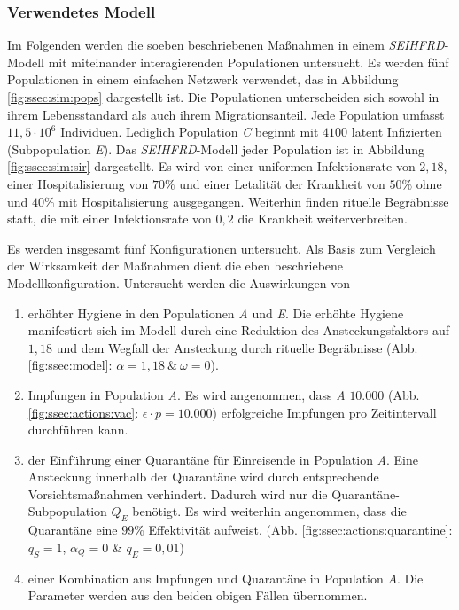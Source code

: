 \subsubsection{Verwendetes Modell}\steffen
Im Folgenden werden die soeben beschriebenen Maßnahmen in einem \emph{SEIHFRD}-Modell mit miteinander interagierenden Populationen untersucht. Es werden fünf Populationen in einem einfachen Netzwerk verwendet, das in Abbildung \ref{fig:ssec:sim:pops} dargestellt ist. Die Populationen unterscheiden sich sowohl in ihrem Lebensstandard als auch ihrem Migrationsanteil. Jede Population umfasst $11,5\cdot 10^6$ Individuen. Lediglich Population \emph{C} beginnt mit $4100$ latent Infizierten (Subpopulation \emph{E}). Das \emph{SEIHFRD}-Modell jeder Population ist in Abbildung \ref{fig:ssec:sim:sir} dargestellt. Es wird von einer uniformen Infektionsrate von $2,18$, einer Hospitalisierung von $70\%$ und einer Letalität der Krankheit von $50\%$ ohne und $40\%$ mit Hospitalisierung ausgegangen. Weiterhin finden rituelle Begräbnisse statt, die mit einer Infektionsrate von $0,2$ die Krankheit weiterverbreiten.

Es werden insgesamt fünf Konfigurationen untersucht. Als Basis zum Vergleich der Wirksamkeit der Maßnahmen dient die eben beschriebene Modellkonfiguration. Untersucht werden die Auswirkungen von 
\begin{enumerate}
\item erhöhter Hygiene in den Populationen \emph{A} und \emph{E}. Die erhöhte Hygiene manifestiert sich im Modell durch eine Reduktion des Ansteckungsfaktors auf $1,18$ und dem Wegfall der Ansteckung durch rituelle Begräbnisse (Abb. \ref{fig:ssec:model}: $\alpha = 1,18~\&~\omega = 0$).
\item Impfungen in Population \emph{A}. Es wird angenommen, dass \emph{A} $10.000$ (Abb. \ref{fig:ssec:actions:vac}: $\epsilon\cdot p = 10.000$) erfolgreiche Impfungen pro Zeitintervall durchführen kann. 
\item der Einführung einer Quarantäne für Einreisende in Population \emph{A}. Eine Ansteckung innerhalb der Quarantäne wird durch entsprechende Vorsichtsmaßnahmen verhindert. Dadurch wird nur die Quarantäne-Subpopulation $Q_E$ benötigt. Es wird weiterhin angenommen, dass die Quarantäne eine $99\%$ Effektivität aufweist. (Abb. \ref{fig:ssec:actions:quarantine}: $q_S=1$, $\alpha_Q=0$ \& $q_E=0,01$)
\item einer Kombination aus Impfungen und Quarantäne in Population $A$. Die Parameter werden aus den beiden obigen Fällen übernommen.
\end{enumerate}

